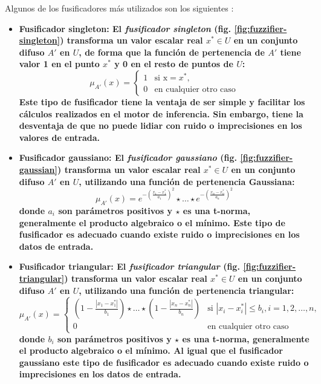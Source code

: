 Algunos de los fusificadores más utilizados son los siguientes \cite{wang1997}:

\begin{itemize}
\item\bfseries Fusificador singleton: \normalfont El \emph{fusificador singleton} (fig. \ref{fig:fuzzifier-singleton}) transforma un valor escalar real $x^* \in U$ en un conjunto difuso $A'$ en $U$, de forma que la función de pertenencia de $A'$ tiene valor 1 en el punto $x^*$ y 0 en el resto de puntos de $U$:
\begin{equation}
\mu_{A'}(x) = \begin{cases} 1 & \mbox{si } \mbox{x}=x^*, \\ 0 & \mbox{en cualquier otro caso} \end{cases}
\end{equation}
Este tipo de fusificador tiene la ventaja de ser simple y facilitar los cálculos realizados en el motor de inferencia. Sin embargo, tiene la desventaja de que no puede lidiar con ruido o imprecisiones en los valores de entrada. 
\item\bfseries Fusificador gaussiano: \normalfont El \emph{fusificador gaussiano} (fig. \ref{fig:fuzzifier-gaussian}) transforma un valor escalar real $x^* \in U$ en un conjunto difuso $A'$ en $U$, utilizando una función de pertenencia Gaussiana:
\begin{equation}
\mu_{A'}(x) = e^{-(\frac{x_1 - x_1^*}{a_1})^2}\star\ldots\star e^{-(\frac{x_n - x_n^*}{a_n})^2}
\end{equation}
donde $a_i$ son parámetros positivos y $\star$ es una t-norma, generalmente el producto algebraico o el mínimo. Este tipo de fusificador es adecuado cuando existe ruido o imprecisiones en los datos de entrada.
\item\bfseries Fusificador triangular: \normalfont El \emph{fusificador triangular} (fig. \ref{fig:fuzzifier-triangular}) transforma un valor escalar real $x^* \in U$ en un conjunto difuso $A'$ en $U$, utilizando una función de pertenencia triangular:
\begin{equation}
\mu_{A'}(x) = \begin{cases} (1 - \frac{|x_1 - x_1^*|}{b_1})\star\ldots\star  (1 - \frac{|x_n - x_n^*|}{b_n}) & \mbox{si } |x_i - x_i^*| \leq b_i, i = 1,2,\ldots,n, \\ 0 & \mbox{en cualquier otro caso} \end{cases}
\end{equation}
donde $b_i$ son parámetros positivos y $\star$ es una t-norma, generalmente el producto algebraico o el mínimo. Al igual que el fusificador gaussiano este tipo de fusificador es adecuado cuando existe ruido o imprecisiones en los datos de entrada.
\end{itemize}


